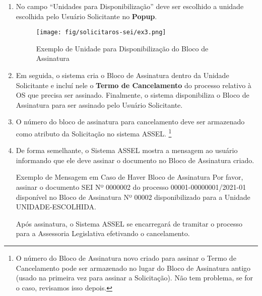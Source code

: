 \begin{enumerate}
\begin{exemplo}[1]{Descrição do Bloco de Assinatura}
		Usuário Solicitante: Nome Completo do Usuário Solicitante do Cancelamento
	\end{exemplo}
	
	\item No campo ``Unidades para Disponibilização'' deve ser escolhido a unidade escolhida pelo Usuário Solicitante no \textbf{Popup}.
	
	\begin{figure}[htbp!]
		\centering
		\texttt{[image: fig/solicitaros-sei/ex3.png]}
		\caption{Exemplo de Unidade para Disponibilização do Bloco de Assinatura}
		\label{fig:solitaros-sei:ex3}
	\end{figure}
	
	
	\item Em seguida, o sistema cria o Bloco de Assinatura dentro da Unidade Solicitante  e incluí nele o \textbf{Termo de Cancelamento} do processo relativo à OS que precisa ser assinado. Finalmente, o sistema disponibiliza o Bloco de Assinatura para ser assinado pelo Usuário Solicitante.
	
	\item O número do bloco de assinatura para cancelamento deve ser armazenado como atributo da Solicitação no sistema ASSEL. \footnote{O número do Bloco de Assinatura novo criado para assinar o Termo de Cancelamento pode ser armazenado no lugar do Bloco de Assinatura antigo (usado na primeira vez para assinar a Solicitação). Não tem problema, se for o caso, revisamos isso depois.}
	

	
	\item De forma semelhante, o Sistema ASSEL mostra a mensagem ao usuário informando que ele deve assinar o documento no Bloco de Assinatura criado.
	
	\begin{exemplo}[1]{Exemplo de Mensagem em Caso de Haver Bloco de Assinatura}
		Por favor, assinar o documento SEI Nº 0000002 do processo 00001-00000001/2021-01 disponível no Bloco de Assinatura Nº 00002 disponibilizado para a Unidade UNIDADE-ESCOLHIDA. 
		
		\vphantom{espaço vertical em branco}			
		
		Após assinatura, o Sistema ASSEL se encarregará de tramitar o processo para a Assessoria Legislativa efetivando o cancelamento.
		
		\vphantom{espaço vertical em branco}	
		
	\end{exemplo}	
	
	
\end{enumerate}	


